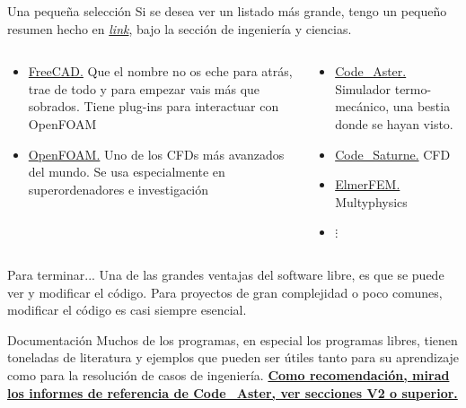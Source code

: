 \documentclass[12pt]{beamer}
\begin{document}
\begin{frame}{Una pequeña selección}
	Si se desea ver un listado más grande, tengo un pequeño resumen hecho en \textit{\href{https://github.com/Irvise/Documents/blob/master/Cheatsheets/Libre/Packages.md}{link}}, bajo la sección de ingeniería y ciencias.
	\begin{columns}
		\begin{column}{0.6\textwidth}
			\begin{itemize}
				\item \href{https://www.freecadweb.org/}{FreeCAD.} Que el nombre no os eche para atrás, trae de todo y para empezar vais más que sobrados. Tiene plug-ins para interactuar con OpenFOAM
				\item \href{https://openfoam.org/}{OpenFOAM.} Uno de los CFDs más avanzados del mundo. Se usa especialmente en superordenadores e investigación
			\end{itemize}
		\end{column}
		\begin{column}{0.5\textwidth}
			\begin{itemize}
				\item \href{https://code-aster.org/spip.php?rubrique2}{Code\_Aster.} Simulador termo-mecánico, una bestia donde se hayan visto.
				\item \href{https://www.code-saturne.org/cms/}{Code\_Saturne.} CFD
				\item \href{http://www.elmerfem.org/blog/}{ElmerFEM.} Multyphysics
				\item $\vdots$
			\end{itemize}
		\end{column}
	\end{columns}
\end{frame}

\begin{frame}{Para terminar...}
	Una de las grandes ventajas del software libre, es que se puede ver y modificar el código. Para proyectos de gran complejidad o poco comunes, modificar el código es casi siempre esencial.
	
	\begin{block}{Documentación}
		Muchos de los programas, en especial los programas libres, tienen toneladas de literatura y ejemplos que pueden ser útiles tanto para su aprendizaje como para la resolución de casos de ingeniería. \href{https://www.code-aster.org/V2/doc/v13/en/index.php?man=R0}{\textbf{Como recomendación, mirad los informes de referencia de Code\_Aster, ver secciones V2 o superior.}}
	\end{block}
\end{frame}
\end{document}
